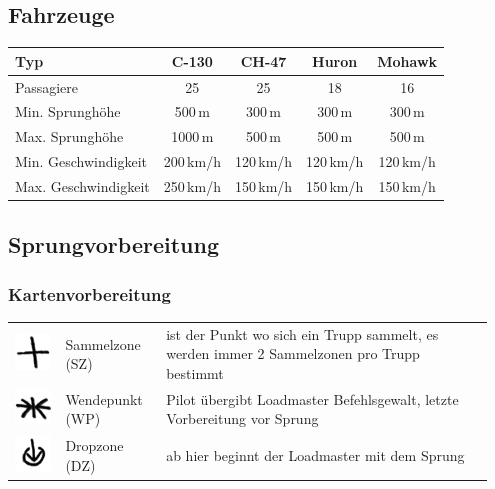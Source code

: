 \pagebreak

\subsection{Fahrzeuge}
\begin{longtable}{lcccc} 
	\toprule
	Typ & C-130 & CH-47 &	Huron	&	Mohawk \\ 
	\midrule
	Passagiere 	&	25 	&	25 	&	18 	&	16 \\ 
	Min. Sprunghöhe	& 500\,m 	& 300\,m 	&	300\,m	&	300\,m	\\
	Max. Sprunghöhe	&	1000\,m 	&	500\,m 	&	500\,m	&	500\,m \\
	Min. Geschwindigkeit	& 	200\,km/h	&	120\,km/h	&	120\,km/h	&	120\,km/h	\\ 
	Max. Geschwindigkeit	& 	250\,km/h	&	150\,km/h &	150\,km/h &	150\,km/h \\
	\bottomrule 
\end{longtable}

\subsection{Sprungvorbereitung}
\subsubsection*{Kartenvorbereitung}
\begin{tabular}{C{0.1\linewidth}m{0.2\linewidth} m{0.65\linewidth}}
	\includegraphics[scale=0.8]{./img/advanced/fallschirmspringen/sammelzone}	& Sammelzone (SZ)	& ist der Punkt wo sich ein Trupp sammelt, es werden immer 2 Sammelzonen pro Trupp bestimmt\\
	\includegraphics[scale=0.8]{./img/advanced/fallschirmspringen/wendepunkt} 	& 	Wendepunkt (WP) & Pilot übergibt Loadmaster Befehlsgewalt, letzte Vorbereitung vor Sprung\\
	\includegraphics[scale=0.8]{./img/advanced/fallschirmspringen/dropzone}	& Dropzone (DZ) & ab hier beginnt der Loadmaster mit dem Sprung
\end{tabular}

